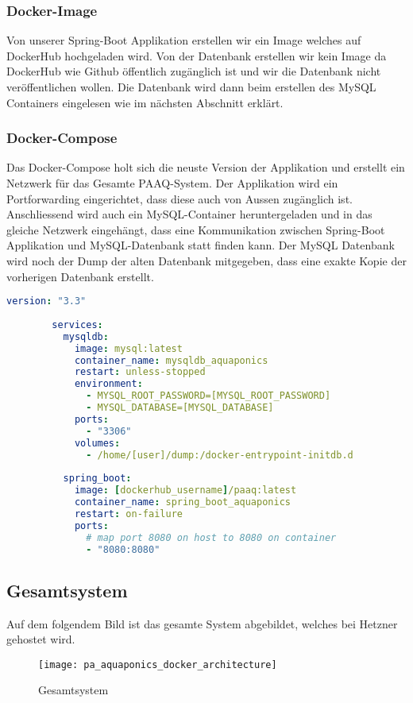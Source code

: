 \documentclass[../main.tex]{subfiles}
\begin{document}
	\subsubsection{Docker-Image}
	Von unserer Spring-Boot Applikation erstellen wir ein Image welches auf DockerHub hochgeladen wird. Von der Datenbank erstellen wir kein Image da DockerHub wie Github öffentlich zugänglich ist und wir die Datenbank nicht veröffentlichen wollen. Die Datenbank wird dann beim erstellen des MySQL Containers eingelesen wie im nächsten Abschnitt erklärt.
	
	\subsubsection{Docker-Compose}
	Das Docker-Compose holt sich die neuste Version der Applikation und erstellt ein Netzwerk für das Gesamte PAAQ-System. Der Applikation wird ein Portforwarding eingerichtet, dass diese auch von Aussen zugänglich ist. Anschliessend wird auch ein MySQL-Container heruntergeladen und in das gleiche Netzwerk eingehängt, dass eine Kommunikation zwischen Spring-Boot Applikation und MySQL-Datenbank statt finden kann. Der MySQL Datenbank wird noch der Dump der alten Datenbank mitgegeben, dass eine exakte Kopie der vorherigen Datenbank erstellt.
	\begin{lstlisting}[language=yaml]
		version: "3.3"
		
		services:
		  mysqldb:
		    image: mysql:latest
		    container_name: mysqldb_aquaponics
		    restart: unless-stopped
		    environment:
		      - MYSQL_ROOT_PASSWORD=[MYSQL_ROOT_PASSWORD]
		      - MYSQL_DATABASE=[MYSQL_DATABASE]
		    ports:
		      - "3306"
		    volumes:
		      - /home/[user]/dump:/docker-entrypoint-initdb.d
		      
		  spring_boot:
		    image: [dockerhub_username]/paaq:latest
		    container_name: spring_boot_aquaponics
		    restart: on-failure
		    ports:
		      # map port 8080 on host to 8080 on container
		      - "8080:8080"
	\end{lstlisting}

	\subsection{Gesamtsystem}
	Auf dem folgendem Bild ist das gesamte System abgebildet, welches bei Hetzner gehostet wird.
	\begin{figure}[h]
		\centering
		\texttt{[image: pa\_aquaponics\_docker\_architecture]}
		\caption{Gesamtsystem}
		\label{fig:Gesamtsystem}
	\end{figure}
	
\end{document}
